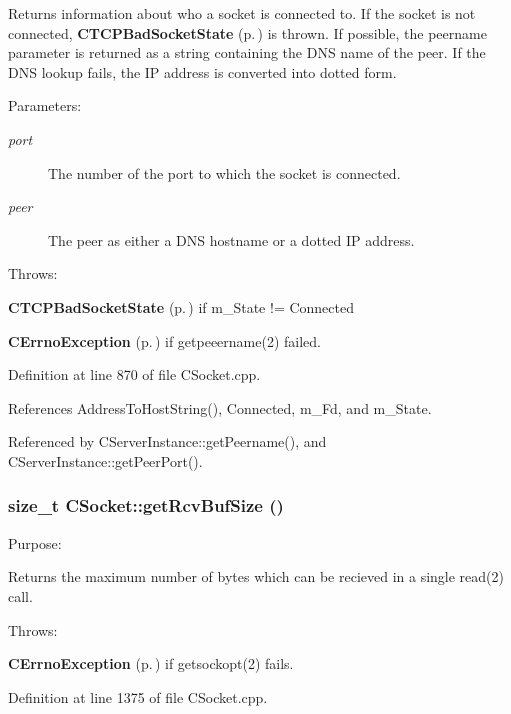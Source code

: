 Returns information about who a socket is connected to. If the socket is not connected, {\bf CTCPBad\-Socket\-State} {\rm (p.\,\pageref{classCTCPBadSocketState})} is thrown. If possible, the peername parameter is returned as a string containing the DNS name of the peer. If the DNS lookup fails, the IP address is converted into dotted form.\begin{Desc}
\item[Parameters: ]\par
\begin{description}
\item[{\em 
port}]The number of the port to which the socket is connected. \item[{\em 
peer}]The peer as either a DNS hostname or a dotted IP address.\end{description}
\end{Desc}
Throws:\begin{CompactItemize}
\item 
{\bf CTCPBad\-Socket\-State} {\rm (p.\,\pageref{classCTCPBadSocketState})} if m\_\-State != Connected\item 
{\bf CErrno\-Exception} {\rm (p.\,\pageref{classCErrnoException})} if getpeeername(2) failed. \end{CompactItemize}


Definition at line 870 of file CSocket.cpp.

References Address\-To\-Host\-String(), Connected, m\_\-Fd, and m\_\-State.

Referenced by CServer\-Instance::get\-Peername(), and CServer\-Instance::get\-Peer\-Port().
\subsubsection{\setlength{\rightskip}{0pt plus 5cm}size\_\-t CSocket::get\-Rcv\-Buf\-Size ()}\label{classCSocket_a31}


Purpose:

Returns the maximum number of bytes which can be  recieved in a single read(2) call.

Throws:\begin{CompactItemize}
\item 
{\bf CErrno\-Exception} {\rm (p.\,\pageref{classCErrnoException})} if getsockopt(2) fails. \end{CompactItemize}


Definition at line 1375 of file CSocket.cpp.

